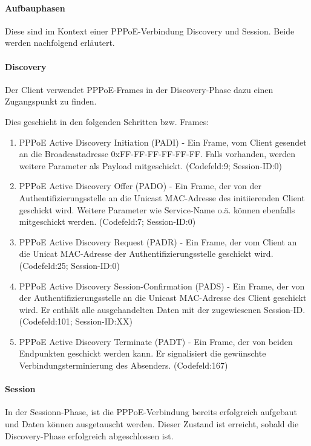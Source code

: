 \paragraph{Aufbauphasen}
Diese sind im Kontext einer PPPoE-Verbindung Discovery und Session.
Beide werden nachfolgend erläutert.

\paragraph{Discovery}
Der Client verwendet PPPoE-Frames in der Discovery-Phase dazu einen
Zugangspunkt zu finden.

Dies geschieht in den folgenden Schritten bzw. Frames:
\begin{enumerate}
\item PPPoE Active Discovery Initiation (PADI) - Ein Frame, vom Client
      gesendet an die Broadcastadresse 0xFF-FF-FF-FF-FF-FF.
      Falls vorhanden, werden weitere Parameter als Payload 
      mitgeschickt. (Codefeld:9; Session-ID:0)
\item PPPoE Active Discovery Offer (PADO) - Ein Frame, der von der
      Authentifizierungsstelle an die Unicast MAC-Adresse des
      initiierenden Client geschickt wird. Weitere Parameter wie
      Service-Name o.ä. können ebenfalls mitgeschickt
      werden. (Codefeld:7; Session-ID:0)
\item PPPoE Active Discovery Request (PADR) - Ein Frame, der vom Client
      an die Unicat MAC-Adresse der Authentifizierungsstelle geschickt
      wird. (Codefeld:25; Session-ID:0)
\item PPPoE Active Discovery Session-Confirmation (PADS) - Ein Frame,
      der von der Authentifizierungsstelle an die Unicast MAC-Adresse
      des Client geschickt wird. Er enthält alle ausgehandelten Daten
      mit der zugewiesenen Session-ID. (Codefeld:101; Session-ID:XX)
\item PPPoE Active Discovery Terminate (PADT) - Ein Frame,
      der von beiden Endpunkten geschickt werden kann. Er signalisiert
      die gewünschte Verbindungsterminierung des Absenders.
      (Codefeld:167)
\end{enumerate}

\paragraph{Session}
In der Sessionn-Phase, ist die PPPoE-Verbindung bereits erfolgreich
aufgebaut und Daten können ausgetauscht werden.
Dieser Zustand ist erreicht, sobald die Discovery-Phase
erfolgreich abgeschlossen ist.

